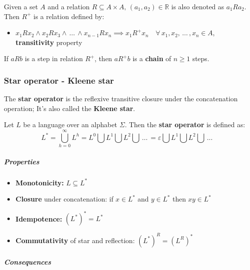 \documentclass[english]{article}
\begin{document}
\begin{definition}
  Given a set \(A\) and a relation \(R \subseteq A \times A, \, (a_1, a_2) \in \mathbb{R}\) is also denoted as \(a_1 R a_2\).
  Then \(R^+\) is a relation defined by:

  \begin{itemize}
    \item \(x_1 R x_2 \land x_2 R x_3 \land \,\ldots\, \land x_{n-1} R x_n \implies x_1 R^+ x_n \quad \forall \, x_1, x_2, \,\ldots\,, x_n \in A\), \textbf{transitivity} property
  \end{itemize}

  If \(a R b\) is a step in relation \(R^+\), then \(a R^+ b\) is a \textbf{chain} of \(n \geq 1\) steps.
\end{definition}

\subsubsection{Star operator - Kleene star}

The \textbf{star operator} is the reflexive transitive closure under the concatenation operation;
It's also called the \textbf{Kleene star}.

\begin{definition}
  Let \(L\) be a language over an alphabet \(\Sigma\).
  Then the \textbf{star operator} is defined as:
  \[ L^\ast = \bigcup_{h=0}^{\infty} L^h = L^0 \bigcup L^1 \bigcup L^2 \bigcup \,\ldots\, = \varepsilon \bigcup L^1 \bigcup L^2
    \bigcup \,\ldots\, \]
\end{definition}

\subparagraph*{Properties}

\begin{itemize}
  \item \textbf{Monotonicity:} \(L \subseteq L^\ast\)
  \item \textbf{Closure} under concatenation: if \(x \in L^\ast\) and \(y \in L^\ast\) then \(xy \in L^\ast\)
  \item \textbf{Idempotence:} \(\left(L^\ast\right)^\ast = L^\ast\)
  \item \textbf{Commutativity} of star and reflection: \(\left(L^\ast\right)^R = \left(L^R\right)^\ast\)

\end{itemize}

\subparagraph*{Consequences}
\end{document}
